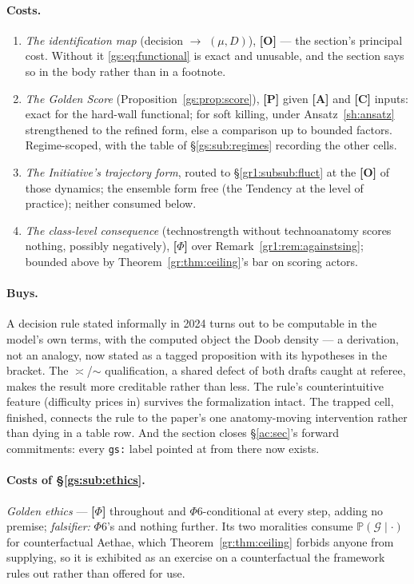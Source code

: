\documentclass[11pt]{article}
\numberwithin{equation}{section}
\theoremstyle{plain}
\theoremstyle{definition}
\theoremstyle{remark}
\newcommand{\PP}{\mathbb{P}}
\begin{document}
\paragraph{Costs.}
\begin{enumerate}
    \item \emph{The identification map} (decision $\to$ $(\mu, D)$), \textbf{[O]} --- the section's principal cost. Without it \eqref{gs:eq:functional} is exact and unusable, and the section says so in the body rather than in a footnote.
    \item \emph{The Golden Score} (Proposition~\ref{gs:prop:score}), \textbf{[P]} given \textbf{[A]} and \textbf{[C]} inputs: exact for the hard-wall functional; for soft killing, under Ansatz~\ref{sh:ansatz} strengthened to the refined form, else a comparison up to bounded factors. Regime-scoped, with the table of \S\ref{gs:sub:regimes} recording the other cells.
    \item \emph{The Initiative's trajectory form}, routed to \S\ref{gr1:subsub:fluct} at the \textbf{[O]} of those dynamics; the ensemble form free (the Tendency at the level of practice); neither consumed below.
    \item \emph{The class-level consequence} (technostrength without technoanatomy scores nothing, possibly negatively), \textbf{[$\Phi$]} over Remark~\ref{gr1:rem:againstsing}; bounded above by Theorem~\ref{gr:thm:ceiling}'s bar on scoring actors.
\end{enumerate}

\paragraph{Buys.} A decision rule stated informally in 2024 turns out to be computable in the model's own terms, with the computed object the Doob density --- a derivation, not an analogy, now stated as a tagged proposition with its hypotheses in the bracket. The $\asymp$/$\sim$ qualification, a shared defect of both drafts caught at referee, makes the result more creditable rather than less. The rule's counterintuitive feature (difficulty prices in) survives the formalization intact. The trapped cell, finished, connects the rule to the paper's one anatomy-moving intervention rather than dying in a table row. And the section closes \S\ref{ac:sec}'s forward commitments: every \texttt{gs:} label pointed at from there now exists.

\paragraph{Costs of \S\ref{gs:sub:ethics}.} \emph{Golden ethics} ---
\textbf{[$\Phi$]} throughout and $\Phi6$-conditional at every step, adding
no premise; \emph{falsifier:} $\Phi6$'s and nothing further. Its two
moralities consume $\PP(\mathcal G\mid\cdot)$ for counterfactual Aethae,
which Theorem~\ref{gr:thm:ceiling} forbids anyone from supplying, so it is
exhibited as an exercise on a counterfactual the framework rules out rather
than offered for use.
\end{document}
